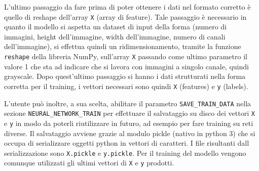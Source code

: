 L’ultimo passaggio da fare prima di poter ottenere i dati nel formato corretto è quello di reshape dell’array \texttt{X} (array di feature). Tale passaggio è necessario in quanto il modello si aspetta un dataset di input della forma (numero di immagini, height dell’immagine, width dell’immagine, numero di canali dell’immagine), si effettua quindi un ridimensionamento, tramite la funzione \texttt{reshape} della libreria NumPy, sull’array \texttt{X} passando come ultimo parametro il valore 1 che sta ad indicare che si lavora con immagini a singolo canale, quindi grayscale. Dopo quest’ultimo passaggio si hanno i dati strutturati nella forma corretta per il training, i vettori necessari sono quindi \texttt{X} (features) e \texttt{y} (labels).

L’utente può inoltre, a sua scelta, abilitare il parametro \texttt{SAVE\_TRAIN\_DATA} nella sezione \texttt{NEURAL\_NETWORK\_TRAIN} per effettuare il salvataggio su disco dei vettori \texttt{X} e \texttt{y} in modo da poterli riutilizzare in futuro, ad esempio per fare training su reti diverse. Il salvataggio avviene grazie al modulo pickle (nativo in python 3) che si occupa di serializzare oggetti python in vettori di caratteri. I file risultanti dall serializzazione sono \texttt{X.pickle} e \texttt{y.pickle}. Per il training del modello vengono comunque utilizzati gli ultimi vettori di \texttt{X} e \texttt{y} prodotti.
